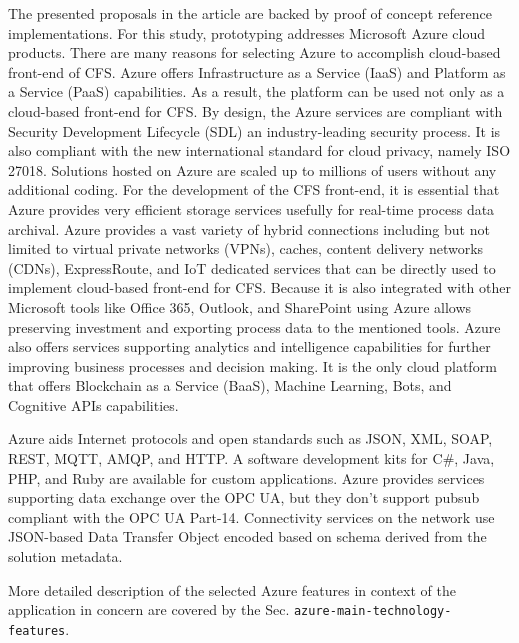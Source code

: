 \documentclass{jacsart}
\begin{document}
The presented proposals in the article are backed by proof of concept
reference implementations. For this study, prototyping addresses
Microsoft Azure cloud products. There are many reasons for selecting
Azure to accomplish cloud-based front-end of CFS. Azure offers
Infrastructure as a Service (IaaS) and Platform as a Service (PaaS)
capabilities. As a result, the platform can be used not only as a
cloud-based front-end for CFS. By design, the Azure services are
compliant with Security Development Lifecycle (SDL) an industry-leading
security process. It is also compliant with the new international
standard for cloud privacy, namely ISO 27018. Solutions hosted on Azure
are scaled up to millions of users without any additional coding. For
the development of the CFS front-end, it is essential that Azure
provides very efficient storage services usefully for real-time process
data archival. Azure provides a vast variety of hybrid connections
including but not limited to virtual private networks (VPNs), caches,
content delivery networks (CDNs), ExpressRoute, and IoT dedicated
services that can be directly used to implement cloud-based front-end
for CFS. Because it is also integrated with other Microsoft tools like
Office 365, Outlook, and SharePoint using Azure allows preserving
investment and exporting process data to the mentioned tools. Azure also
offers services supporting analytics and intelligence capabilities for
further improving business processes and decision making. It is the only
cloud platform that offers Blockchain as a Service (BaaS), Machine
Learning, Bots, and Cognitive APIs capabilities.

Azure aids Internet protocols and open standards such as JSON, XML,
SOAP, REST, MQTT, AMQP, and HTTP. A software development kits for C\#,
Java, PHP, and Ruby are available for custom applications. Azure
provides services supporting data exchange over the OPC UA, but they
don't support pubsub compliant with the OPC UA Part-14. Connectivity
services on the network use JSON-based Data Transfer Object encoded
based on schema derived from the solution metadata.

More detailed description of the selected Azure features in context of
the application in concern are covered by the Sec.
\texttt{azure-main-technology-features}.
\end{document}
